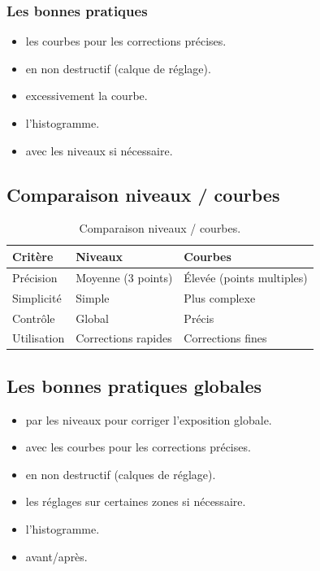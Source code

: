 \subsubsection{Les bonnes pratiques}

\begin{itemize}
    \item {} les courbes pour les corrections précises.
    \item {} en non destructif (calque de réglage).
    \item {} excessivement la courbe.
    \item {} l'histogramme.
    \item {} avec les niveaux si nécessaire.
\end{itemize}

\subsection{Comparaison niveaux / courbes}

\begin{table}[h!]
\centering
\begin{tabular}{@{}p{3.5cm}p{5cm}p{5cm}@{}}
\toprule
\textbf{Critère} & \textbf{Niveaux} & \textbf{Courbes} \\
\midrule
Précision & Moyenne (3 points) & Élevée (points multiples) \\
Simplicité & Simple & Plus complexe \\
Contrôle & Global & Précis \\
Utilisation & Corrections rapides & Corrections fines \\
\bottomrule
\end{tabular}
\caption{Comparaison niveaux / courbes.}
\end{table}

\subsection{Les bonnes pratiques globales}

\begin{itemize}
    \item {} par les niveaux pour corriger l'exposition globale.
    \item {} avec les courbes pour les corrections précises.
    \item {} en non destructif (calques de réglage).
    \item {} les réglages sur certaines zones si nécessaire.
    \item {} l'histogramme.
    \item {} avant/après.
\end{itemize}

